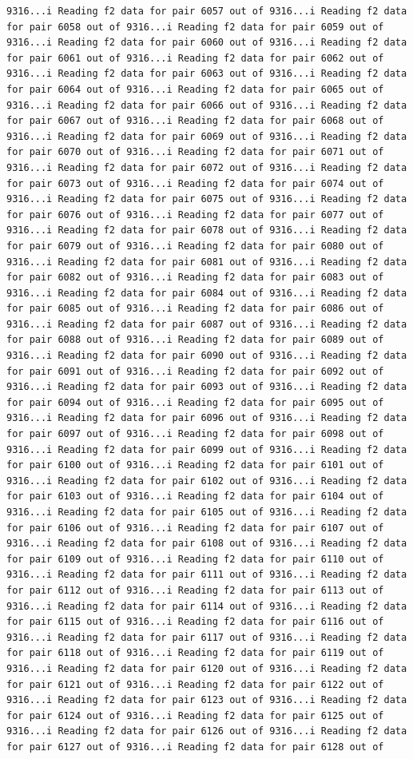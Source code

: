 \documentclass[
]{article}
\begin{document}
\begin{verbatim}
9316...i Reading f2 data for pair 6057 out of 9316...i Reading f2 data for pair 6058 out of 9316...i Reading f2 data for pair 6059 out of 9316...i Reading f2 data for pair 6060 out of 9316...i Reading f2 data for pair 6061 out of 9316...i Reading f2 data for pair 6062 out of 9316...i Reading f2 data for pair 6063 out of 9316...i Reading f2 data for pair 6064 out of 9316...i Reading f2 data for pair 6065 out of 9316...i Reading f2 data for pair 6066 out of 9316...i Reading f2 data for pair 6067 out of 9316...i Reading f2 data for pair 6068 out of 9316...i Reading f2 data for pair 6069 out of 9316...i Reading f2 data for pair 6070 out of 9316...i Reading f2 data for pair 6071 out of 9316...i Reading f2 data for pair 6072 out of 9316...i Reading f2 data for pair 6073 out of 9316...i Reading f2 data for pair 6074 out of 9316...i Reading f2 data for pair 6075 out of 9316...i Reading f2 data for pair 6076 out of 9316...i Reading f2 data for pair 6077 out of 9316...i Reading f2 data for pair 6078 out of 9316...i Reading f2 data for pair 6079 out of 9316...i Reading f2 data for pair 6080 out of 9316...i Reading f2 data for pair 6081 out of 9316...i Reading f2 data for pair 6082 out of 9316...i Reading f2 data for pair 6083 out of 9316...i Reading f2 data for pair 6084 out of 9316...i Reading f2 data for pair 6085 out of 9316...i Reading f2 data for pair 6086 out of 9316...i Reading f2 data for pair 6087 out of 9316...i Reading f2 data for pair 6088 out of 9316...i Reading f2 data for pair 6089 out of 9316...i Reading f2 data for pair 6090 out of 9316...i Reading f2 data for pair 6091 out of 9316...i Reading f2 data for pair 6092 out of 9316...i Reading f2 data for pair 6093 out of 9316...i Reading f2 data for pair 6094 out of 9316...i Reading f2 data for pair 6095 out of 9316...i Reading f2 data for pair 6096 out of 9316...i Reading f2 data for pair 6097 out of 9316...i Reading f2 data for pair 6098 out of 9316...i Reading f2 data for pair 6099 out of 9316...i Reading f2 data for pair 6100 out of 9316...i Reading f2 data for pair 6101 out of 9316...i Reading f2 data for pair 6102 out of 9316...i Reading f2 data for pair 6103 out of 9316...i Reading f2 data for pair 6104 out of 9316...i Reading f2 data for pair 6105 out of 9316...i Reading f2 data for pair 6106 out of 9316...i Reading f2 data for pair 6107 out of 9316...i Reading f2 data for pair 6108 out of 9316...i Reading f2 data for pair 6109 out of 9316...i Reading f2 data for pair 6110 out of 9316...i Reading f2 data for pair 6111 out of 9316...i Reading f2 data for pair 6112 out of 9316...i Reading f2 data for pair 6113 out of 9316...i Reading f2 data for pair 6114 out of 9316...i Reading f2 data for pair 6115 out of 9316...i Reading f2 data for pair 6116 out of 9316...i Reading f2 data for pair 6117 out of 9316...i Reading f2 data for pair 6118 out of 9316...i Reading f2 data for pair 6119 out of 9316...i Reading f2 data for pair 6120 out of 9316...i Reading f2 data for pair 6121 out of 9316...i Reading f2 data for pair 6122 out of 9316...i Reading f2 data for pair 6123 out of 9316...i Reading f2 data for pair 6124 out of 9316...i Reading f2 data for pair 6125 out of 9316...i Reading f2 data for pair 6126 out of 9316...i Reading f2 data for pair 6127 out of 9316...i Reading f2 data for pair 6128 out of 
\end{verbatim}
\end{document}
